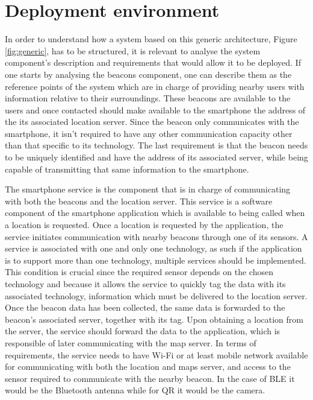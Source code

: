\section{Deployment environment} 
\label{sec:deployment} 
 
 
In order to understand how a system based on this generic architecture, Figure \ref{fig:generic}, has to be structured, it is relevant to analyse the system component's description and requirements that would allow it to be deployed. If one starts by analysing the beacons component, one can describe them as the reference points of the system which are in charge of providing nearby users with information relative to their surroundings. These beacons are available to the users and once contacted should make available to the smartphone the address of the its associated location server. Since the beacon only communicates with the smartphone, it isn't required to have any other communication capacity other than that specific to its technology. The last requirement is that the beacon needs to be uniquely identified and have the address of its associated server, while being capable of transmitting that same information to the smartphone. 
 
 
The smartphone service is the component that is in charge of communicating with both the beacons and the location server. This service is a software component of the smartphone application which is available to being called when a location is requested. Once a location is requested by the application, the service initiates communication with nearby beacons through one of its sensors. A service is associated with one and only one technology, as such if the application is to support more than one technology, multiple services should be implemented. This condition is crucial since the required sensor depends on the chosen technology and because it allows the service to quickly tag the data with its associated technology, information which must be delivered to the location server. Once the beacon data has been collected, the same data is forwarded to the beacon's associated server, together with its tag. Upon obtaining a location from the server, the service should forward the data to the application, which is responsible of later communicating with the map server. In terms of requirements, the service needs to have Wi-Fi or at least mobile network available for communicating with both the location and maps server, and access to the sensor required to communicate with the nearby beacon. In the case of BLE it would be the Bluetooth antenna while for QR it would be the camera. 
 
